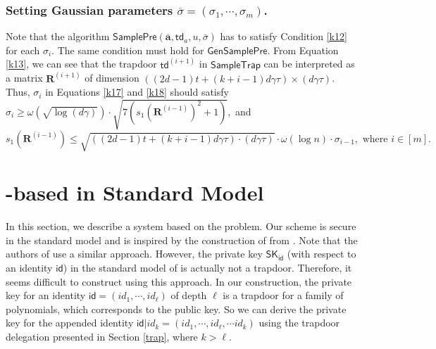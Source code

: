 \documentclass[runningheads]{llncs}
\begin{document}
\subsubsection{Setting Gaussian parameters $\overline{\sigma}=(\sigma_{1}, \cdots, \sigma_{m})$.} 
Note that the algorithm 
$\mathsf{SamplePre}(\overline{\textbf{a}},\mathsf{td}_a, u,\overline{\sigma})$ 
has to satisfy
Condition \eqref{k12} for each $\sigma_i$.
The same condition must hold for
$\mathsf{GenSamplePre}$.
From Equation \eqref{k13},  we can see that 
the trapdoor $\mathsf{td}^{(i+1)}$ in $\mathsf{SampleTrap}$
can be interpreted as a matrix $\mathbf{R}^{(i+1)}$ of dimension $((2d-1)t+(k+i-1)d\gamma \tau)\times (d\gamma \tau)$.
Thus, $\sigma_{i}$ in Equations \eqref{k17} and \eqref{k18}
should satisfy  $\sigma_{i} \geq \omega(\sqrt{\log (d\gamma)})\cdot \sqrt{7(s_1(\mathbf{R}^{(i-1)})^2+1)}, $     
and \begin{equation*}
s_1(\mathbf{R}^{(i-1)}) \leq \sqrt{((2d-1)t+(k+i-1)d\gamma \tau)\cdot (d\gamma \tau)}\cdot \omega(\log n)\cdot \sigma_{i-1}, \text{ where } i\in [m].
\end{equation*}
    
\section{-based  in Standard Model} \label{sec4}
In this section, we describe a  system based on the  problem. 
Our   scheme is  secure in the standard model 
and is inspired by the construction of  from \cite{AB09}. 
Note that the authors of \cite{LVV19} use a similar approach.
However, the private key $\textsf{SK}_\textsf{id}$ (with respect 
to an identity $\textsf{id}$) in the standard model  of \cite{LVV19} 
is actually not a trapdoor.
Therefore, it seems difficult to construct  using this approach. 
In our  construction, the private key for an identity   
$\textsf{id}=(id_1, \cdots, id_\ell)$ of depth $\ell$ is a 
trapdoor for a family of polynomials, which corresponds to the public key. 
So we can derive the private key for the appended identity  $\textsf{id}|id_{k}=(id_1, \cdots,id_\ell,\cdots id_k) $ using the trapdoor delegation presented in Section \ref{trap},
where $k>\ell$.
\end{document}
